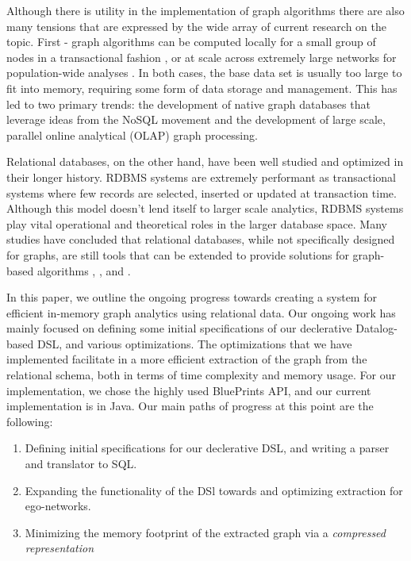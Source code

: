 \documentclass[11pt,letterpaper]{article}
\begin{document}
Although there is utility in the implementation of graph algorithms there are also many tensions that are expressed by the wide array of current research on the topic. First - graph algorithms can be computed locally for a small group of nodes in a transactional fashion \cite{jadhav_comparative_2014}, or at scale across extremely large networks for population-wide analyses \cite{cuzzocrea_big_2014}. In both cases, the base data set is usually too large to fit into memory, requiring some form of data storage and management. This has led to two primary trends: the development of native graph databases that leverage ideas from the NoSQL movement and the development of large scale, parallel online analytical (OLAP) graph processing.

Relational databases, on the other hand, have been well studied and optimized in their longer history. RDBMS systems are extremely performant as transactional systems where few records are selected, inserted or updated at transaction time. Although this model doesn't lend itself to larger scale analytics, RDBMS systems play vital operational and theoretical roles in the larger database space. Many studies have concluded that relational databases, while not specifically designed for graphs, are still tools that can be extended to provide solutions for graph-based algorithms \cite{welc_graph_2013}, \cite{najork_hammers_2012}, and \cite{vicknair_comparison_2010}.

In this paper, we outline the ongoing progress towards creating a system for efficient in-memory graph analytics using relational data. Our ongoing work has mainly focused on defining some initial specifications of our declerative Datalog-based DSL, and various optimizations. The optimizations that we have implemented facilitate in a more efficient extraction of the graph from the relational schema, both in terms of time complexity and memory usage. For our implementation, we chose the highly used BluePrints API, and our current implementation is in Java. Our main paths of progress at this point are the following:\\

\begin{enumerate}

	\item Defining initial specifications for our declerative DSL, and writing a parser and translator to SQL.
	\item Expanding the functionality of the DSl towards and optimizing extraction for ego-networks.
	\item Minimizing the memory footprint of the extracted graph via a \textit{compressed representation} %

\end{enumerate}
\end{document}

